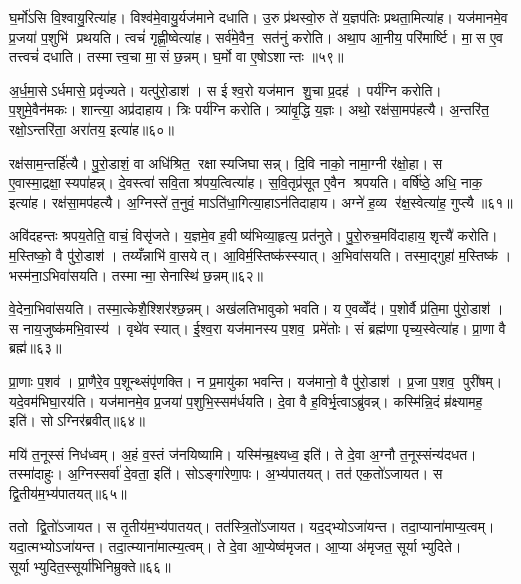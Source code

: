 घ॒र्मो॑ऽसि वि॒श्वायु॒रित्या॑ह। विश्व॑मे॒वायु॒र्यज॑माने दधाति। उ॒रु प्र॑थस्वो॒रु ते॑ य॒ज्ञप॑तिः प्रथता॒मित्या॑ह। यज॑मानमे॒व प्र॒जया॑ प॒शुभि॑ प्रथयति। त्वचं॑ गृह्णी॒ष्वेत्या॑ह। सर्व॑मे॒वैन॒ सत॑नुं करोति। अथा॒प आ॒नीय॒ परि॑मार्ष्टि। मा॒स ए॒व तत्त्वचं॑ दधाति। तस्मात्त्व॒चा मा॒सं छ॒न्नम्। घ॒र्मो वा ए॒षोऽशान्तः ॥५९॥

अ॒र्ध॒मा॒सेऽर्धमासे॒ प्रवृ॑ज्यते। यत्पु॑रो॒डाश॑। स ईश्व॒रो यज॑मान शु॒चा प्र॒दह॑। पर्य॑ग्नि करोति। प॒शुमे॒वैन॑मकः। शान्त्या॒ अप्र॑दाहाय। त्रिः पर्य॑ग्नि करोति। त्र्या॑वृ॒द्धि य॒ज्ञः। अथो॒ रक्ष॑सा॒मप॑हत्यै। अ॒न्तरि॑त॒ रक्षो॒ऽन्तरि॑ता॒ अरा॑तय॒ इत्या॑ह॥६०॥

रक्ष॑साम॒न्तर्\mbox{}हि॑त्यै। पु॒रो॒डाशं॒ वा अधि॑श्रित॒ रक्षास्यजिघासन्न्। दि॒वि नाको॒ नामा॒ग्नी र॑क्षो॒हा। स ए॒वास्मा॒द्रक्षा॒स्यपा॑हन्न्। दे॒वस्त्वा॑ सवि॒ता श्र॑पय॒त्वित्या॑ह। स॒वि॒तृप्र॑सूत ए॒वैन श्रपयति। वर्\mbox{}षि॑ष्ठे॒ अधि॒ नाक॒ इत्या॑ह। रक्ष॑सा॒मप॑हत्यै। अ॒ग्निस्ते॑ त॒नुवं॒ माऽति॑धा॒गित्या॒हाऽन॑तिदाहाय। अग्ने॑ ह॒व्य र॑क्ष॒स्वेत्या॑ह॒ गुप्त्यै॥६१॥

अवि॑दहन्तः श्रपय॒तेति॒ वाचं॒ विसृ॑जते। य॒ज्ञमे॒व ह॒वीष्य॑भिव्या॒हृत्य॒ प्रत॑नुते। पु॒रो॒रुच॒मवि॑दाहाय॒ शृत्त्यै॑ करोति। म॒स्तिष्को॒ वै पु॑रो॒डाश॑। तय्यँन्नाभि॑ वा॒सयेत्। आ॒विर्म॒स्तिष्क॑स्स्यात्। अ॒भिवा॑सयति। तस्मा॒द्गुहा॑ म॒स्तिष्क॑। भस्म॑ना॒ऽभिवा॑सयति। तस्मान्मा॒सेनास्थि॑ छ॒न्नम्॥६२॥

वे॒देना॒भिवा॑सयति। तस्मा॒त्केशै॒श्शिर॑श्छ॒न्नम्। अख॑लतिभावुको भवति। य ए॒वव्वेँद॑। प॒शोर्वै प्र॑ति॒मा पु॑रो॒डाश॑। स नाय॒जुष्क॑मभि॒वास्य॑। वृथे॑व स्यात्। ई॒श्व॒रा यज॑मानस्य प॒शव॒ प्रमे॑तोः। सं ब्रह्म॑णा पृच्य॒स्वेत्या॑ह। प्रा॒णा वै ब्रह्म॑॥६३॥

प्रा॒णाः प॒शव॑। प्रा॒णैरे॒व प॒शून्थ्संपृ॑णक्ति। न प्र॒मायु॑का भवन्ति। यज॑मानो॒ वै पु॑रो॒डाश॑। प्र॒जा प॒शव॒ पुरी॑षम्। यदे॒वम॑भिघा॒रय॑ति। यज॑मानमे॒व प्र॒जया॑ प॒शुभि॒स्सम॑र्धयति। दे॒वा वै ह॒विर्भृ॒त्वाऽब्रु॑वन्न्। कस्मि॑न्नि॒दं म्र॑क्ष्यामह॒ इति॑। सोऽग्निर॑ब्रवीत्॥६४॥

मयि॑ त॒नूस्सं निध॑ध्वम्। अ॒हं व॒स्तं ज॑नयिष्यामि। यस्मि॑न्म्र॒क्ष्यध्व॒ इति॑। ते दे॒वा अ॒ग्नौ त॒नूस्संन्य॑दधत। तस्मा॑दाहुः। अ॒ग्निस्सर्वा॑ दे॒वता॒ इति॑। सोऽङ्गा॑रेणा॒पः। अ॒भ्य॑पातयत्। तत॑ एक॒तो॑ऽजायत। स द्वि॒तीय॑म॒भ्य॑पातयत्॥६५॥

ततो द्वि॒तो॑ऽजायत। स तृ॒तीय॑म॒भ्य॑पातयत्। तत॑स्त्रि॒तो॑ऽजायत। यद॒द्भ्योऽजा॑यन्त। तदा॒प्याना॑माप्य॒त्वम्। यदा॒त्मभ्योऽजा॑यन्त। तदा॒त्म्याना॑मात्म्य॒त्वम्। ते दे॒वा आ॒प्येष्व॑मृजत। आ॒प्या अ॑मृजत॒ सूर्याभ्युदिते। सूर्याभ्युदित॒स्सूर्या॑भिनिम्रुक्ते॥६६॥

